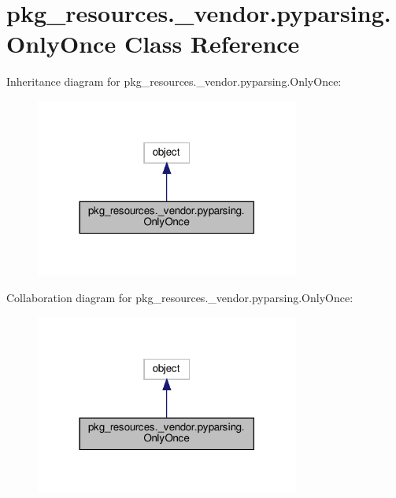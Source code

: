 \hypertarget{classpkg__resources_1_1__vendor_1_1pyparsing_1_1OnlyOnce}{}\section{pkg\+\_\+resources.\+\_\+vendor.\+pyparsing.\+Only\+Once Class Reference}
\label{classpkg__resources_1_1__vendor_1_1pyparsing_1_1OnlyOnce}


Inheritance diagram for pkg\+\_\+resources.\+\_\+vendor.\+pyparsing.\+Only\+Once\+:
\nopagebreak
\begin{figure}[H]
\begin{center}
\leavevmode
\includegraphics[width=246pt]{classpkg__resources_1_1__vendor_1_1pyparsing_1_1OnlyOnce__inherit__graph}
\end{center}
\end{figure}


Collaboration diagram for pkg\+\_\+resources.\+\_\+vendor.\+pyparsing.\+Only\+Once\+:
\nopagebreak
\begin{figure}[H]
\begin{center}
\leavevmode
\includegraphics[width=246pt]{classpkg__resources_1_1__vendor_1_1pyparsing_1_1OnlyOnce__coll__graph}
\end{center}
\end{figure}
